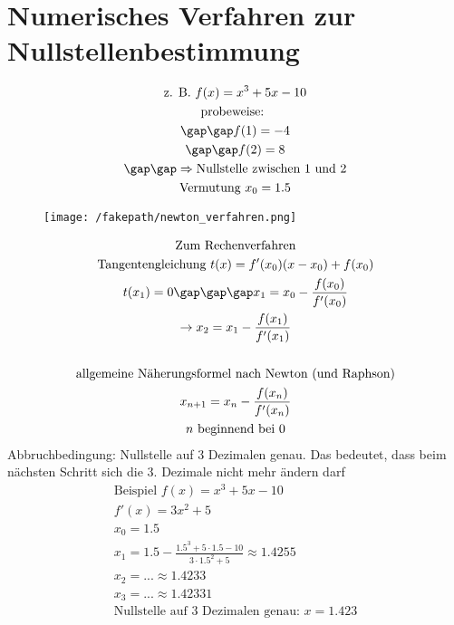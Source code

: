 \section{Numerisches Verfahren zur Nullstellenbestimmung}
\begin{gather*}
  \text{z. B. } f(x) = x^3 + 5x - 10 \\
  \text{probeweise: } \\
  \gap\gap f(1) = -4 \\
  \gap\gap f(2) = 8 \\
  \gap\gap \Rightarrow \text{Nullstelle zwischen 1 und 2} \\
  \text{Vermutung } x_0 = 1.5
\end{gather*}
\begin{figure}[H]
  \centering
  \texttt{[image: /fakepath/newton\_verfahren.png]}
\end{figure}
\begin{gather*}
  \text{Zum Rechenverfahren} \\
  \text{Tangentengleichung } t(x) = f'(x_0)(x - x_0) + f(x_0) \\
  t(x_1) = 0 \gap\gap\gap x_1 = x_0 - \frac{f(x_0)}{f'(x_0)} \\
  \rightarrow x_2 = x_1 - \frac{f(x_1)}{f'(x_1)} \\\\
  \text{allgemeine Näherungsformel nach Newton (und Raphson)} \\
  x_{n + 1} = x_n - \frac{f(x_n)}{f'(x_n)} \\
  n \text{ beginnend bei 0}
\end{gather*}
Abbruchbedingung: Nullstelle auf 3 Dezimalen genau. Das bedeutet, dass beim nächsten Schritt sich die 3. Dezimale nicht mehr ändern darf
\newpage
\begin{gather*}
  \text{Beispiel } f(x) = x^3 + 5x - 10 \\
  f'(x) = 3x^2 + 5 \\
  x_0 = 1.5 \\
  x_1 = 1.5 - \frac{1.5^3 + 5 \cdot 1.5 - 10}{3 \cdot 1.5^2 + 5} \approx 1.4255 \\
  x_2 = ... \approx 1.4233 \\
  x_3 = ... \approx 1.42331 \\
  \text{Nullstelle auf 3 Dezimalen genau: } x = 1.423
\end{gather*}
